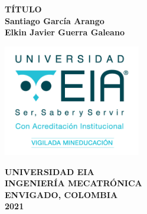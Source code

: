 \documentclass[11pt]{report} %
\begin{document}
\begin{titlepage} %

\begin{center}

\begin{Large}
\vspace*{1cm}
\textbf{TÍTULO}\\[6.5cm]

\textbf{Santiago García Arango} \\
\textbf{Elkin Javier Guerra Galeano}

\end{Large}

\vfill

\includegraphics[width=6cm]{assets/imgs/logoeia.png}\\

\begin{large}
\textbf{UNIVERSIDAD EIA}\\
\textbf{INGENIERÍA MECATRÓNICA}\\
\textbf{ENVIGADO, COLOMBIA}\\
\textbf{2021}\\
\end{large}
\end{center}
\end{titlepage}
\end{document}
